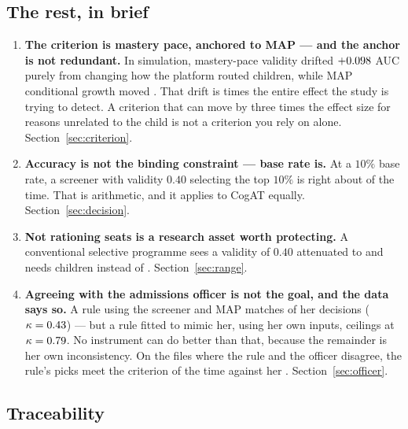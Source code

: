 \documentclass[11pt,a4paper]{article}
\begin{document}
\subsection{The rest, in brief}

\begin{enumerate}[leftmargin=1.4em,itemsep=0.4em]

\item \textbf{The criterion is mastery pace, anchored to MAP --- and the anchor
is not redundant.} In simulation, mastery-pace validity drifted
$+0.098{}$ AUC purely from changing how the platform routed
children, while MAP conditional growth moved \RoutingDriftMAP{}. That drift is
\DriftVsEffect{} times the entire effect the study is trying to detect. A
criterion that can move by three times the effect size for reasons unrelated to
the child is not a criterion you rely on alone. Section~\ref{sec:criterion}.

\item \textbf{Accuracy is not the binding constraint --- base rate is.} At a
$10\%$ base rate, a screener with validity $0.40$ selecting the top $10\%$ is
right about \PPVFortyTenPct{} of the time. That is arithmetic, and it applies to
CogAT equally. Section~\ref{sec:decision}.

\item \textbf{Not rationing seats is a research asset worth protecting.} A
conventional selective programme sees a validity of $0.40$ attenuated to
\RestrictedTenFromForty{} and needs \NrestrictedForty{} children instead of
\NunrestrictedForty{}. Section~\ref{sec:range}.

\item \textbf{Agreeing with the admissions officer is not the goal, and the
data says so.} A rule using the screener and MAP matches \OfficerMatchPct{} of
her decisions ($\kappa=0.43$) --- but a rule fitted to mimic her, using
her own inputs, ceilings at $\kappa=0.79$. No instrument can do
better than that, because the remainder is her own inconsistency. On the files
where the rule and the officer disagree, the rule's picks meet the criterion
\OfficerRuleHitPct{} of the time against her \OfficerHerHitPct{}.
Section~\ref{sec:officer}.

\end{enumerate}

\subsection{Traceability}
\end{document}
